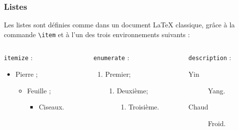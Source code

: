 \documentclass[10pt,    %
    french,             %
    xcolor=table,       %
    envcountsect,       %
    aspectratio=43      %
]{beamer}
\begin{document}
\begin{frame}
    \frametitle{Listes}
    
    Les listes sont définies comme dans un document \LaTeX{} classique, grâce à la commande \texttt{\textbackslash{}item} et à l'un des trois environnements suivants :
    \begin{columns}[T,onlytextwidth]
        \begin{column}{0.33\textwidth}
            \texttt{itemize} :
            \begin{itemize}
                \item Pierre ;
                \begin{itemize}
                    \item Feuille ;
                    \begin{itemize}
                        \item Ciseaux.
                    \end{itemize}
                \end{itemize}
            \end{itemize}
        \end{column}
        \begin{column}{0.33\textwidth}
            \texttt{enumerate} :
            \begin{enumerate}
                \item Premier;
                \begin{enumerate}
                    \item Deuxième;
                    \begin{enumerate}
                        \item Troisième.
                    \end{enumerate}
                \end{enumerate}
            \end{enumerate}
        \end{column}
        \begin{column}{0.33\textwidth}
            \texttt{description} :
            \begin{description}
                \item[Yin] Yang.
                \item[Chaud] Froid.
            \end{description}
        \end{column}
    \end{columns}
    

\end{frame}
\end{document}
